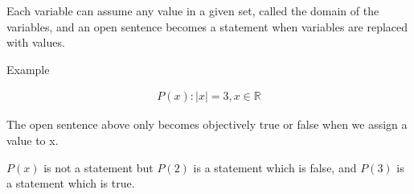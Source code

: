 \documentclass{report}
\begin{document}
\begin{description}
\begin{mdframed}
            Each variable can assume any value in a given
            set, called the domain of the variables, and
            an open sentence becomes a statement when variables
            are replaced with values.
        \end{mdframed}

    \item Example

        \begin{gather}
            P(x): |x| = 3, x \in \mathbb{R} 
        \end{gather}

        The open sentence above only becomes objectively
        true or false when we assign a value to x.

        $P(x)$ is not a statement but $P(2)$ is a statement
        which is false, and $P(3)$ is a statement which is true.


\end{description}
\end{document}
